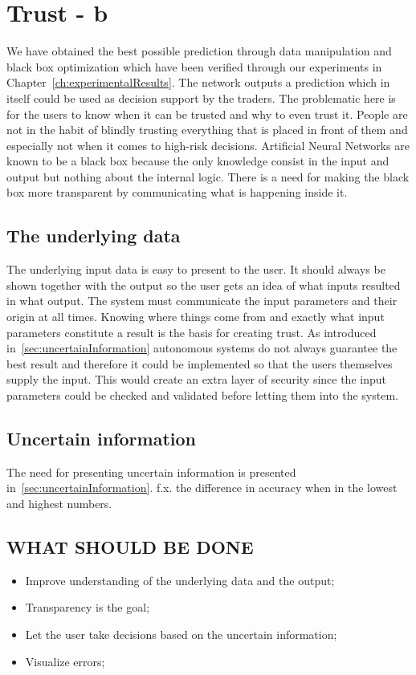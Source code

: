\section{Trust - b}
We have obtained the best possible prediction through data manipulation and black box optimization which have been verified through our experiments in Chapter~\ref{ch:experimentalResults}. The network outputs a prediction which in itself could be used as decision support by the traders. The problematic here is for the users to know when it can be trusted and why to even trust it. People are not in the habit of blindly trusting everything that is placed in front of them and especially not when it comes to high-risk decisions. 
Artificial Neural Networks are known to be a black box \cite{fromBlackBoxToTransparentBox} because the only knowledge consist in the input and output but nothing about the internal logic. There is a need for making the black box more transparent by communicating what is happening inside it.


\subsection{The underlying data}
The underlying input data is easy to present to the user. It should always be shown together with the output so the user gets an idea of what inputs resulted in what output. The system must communicate the input parameters and their origin at all times. Knowing where things come from and exactly what input parameters constitute a result is the basis for creating trust. As introduced in~\ref{sec:uncertainInformation} autonomous systems do not always guarantee the best result and therefore it could be implemented so that the users themselves supply the input. This would create an extra layer of security since the input parameters could be checked and validated before letting them into the system. 


\subsection{Uncertain information}
The need for presenting uncertain information is presented in~\ref{sec:uncertainInformation}.
f.x. the difference in accuracy when in the lowest and highest numbers.

\subsection{}


\subsection{WHAT SHOULD BE DONE}
\begin{itemize}
\item Improve understanding of the underlying data and the output;
\item Transparency is the goal;
\item Let the user take decisions based on the uncertain information;
\item Visualize errors;
\end{itemize}
